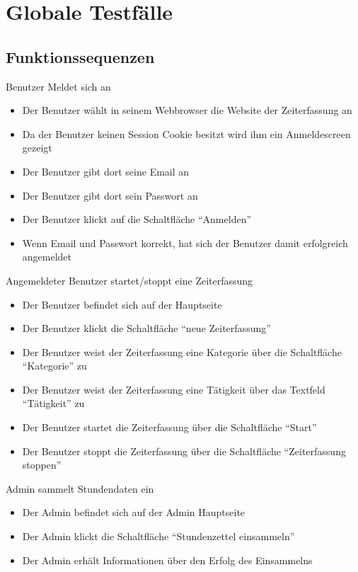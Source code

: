 \section{Globale Testfälle}

\subsection{Funktionssequenzen}
\begin{requirements}
	 Benutzer Meldet sich an
	\begin{itemize}
  			\item Der Benutzer wählt in seinem Webbrowser die Website der Zeiterfassung an
  			\item Da der Benutzer keinen Session Cookie besitzt wird ihm ein Anmeldescreen gezeigt
  			\item Der Benutzer gibt dort seine Email an
  			\item Der Benutzer gibt dort sein Passwort an
  			\item Der Benutzer klickt auf die Schaltfläche "`Anmelden"'
  			\item Wenn Email und Passwort korrekt, hat sich der Benutzer damit erfolgreich angemeldet
	\end{itemize}
	 Angemeldeter Benutzer startet/stoppt eine Zeiterfassung
	\begin{itemize}
		\item Der Benutzer befindet sich auf der Hauptseite
		\item Der Benutzer klickt die Schaltfläche "`neue Zeiterfassung"'
		\item Der Benutzer weist der Zeiterfassung eine Kategorie über die Schaltfläche "`Kategorie"' zu
		\item Der Benutzer weist der Zeiterfassung eine Tätigkeit über das Textfeld "`Tätigkeit"' zu
		\item Der Benutzer startet die Zeiterfassung über die Schaltfläche "`Start"'
		\item Der Benutzer stoppt die Zeiterfassung über die Schaltfläche "`Zeiterfassung stoppen"'
	\end {itemize}
	 Admin sammelt Stundendaten ein
	\begin{itemize}
		\item Der Admin befindet sich auf der Admin Hauptseite
		\item Der Admin klickt die Schaltfläche "`Stundenzettel einsammeln"'
		\item Der Admin erhält Informationen über den Erfolg des Einsammelns

\end{itemize}
\end{requirements}
